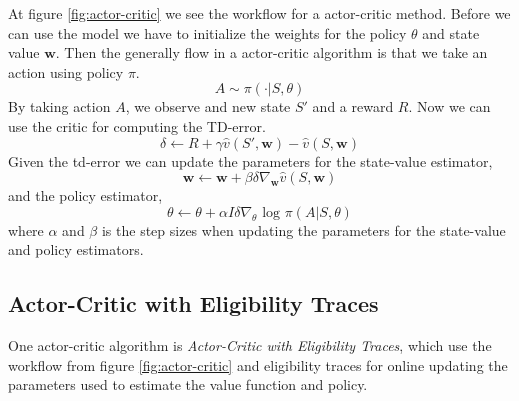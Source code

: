 \documentclass[11pt]{article}
\begin{document}
At figure \ref{fig:actor-critic} we see the workflow for a actor-critic method. Before we can use the model we have to initialize the weights for the policy $\theta$ and state value $\mathbf{w}$. Then the generally flow in a actor-critic algorithm is that we take an action using policy $\pi$.
\begin{equation}
    A \sim \pi(\cdot | S, \theta)
\end{equation}
By taking action $A$, we observe and new state $S'$ and a reward $R$. Now we can use the critic for computing the TD-error.
\begin{equation}
    \delta \leftarrow R + \gamma \hat{v} (S', \mathbf{w}) - \hat{v}(S, \mathbf{w})
\end{equation}
Given the td-error we can update the parameters for the  state-value estimator,
\begin{equation}
    \mathbf{w} \leftarrow \mathbf{w} + \beta \delta \nabla_{\mathbf{w}} \hat{v}(S, \mathbf{w})
\end{equation}
and the policy estimator,
\begin{equation}
    \theta \leftarrow \theta + \alpha I \delta \nabla_{\theta} \text{ log } \pi(A | S, \theta)
\end{equation}
where $\alpha$ and $\beta$ is the step sizes when updating the parameters for the state-value and policy estimators.


\subsection{Actor-Critic with Eligibility Traces}

One actor-critic algorithm is \textit{Actor-Critic with Eligibility Traces}, which use the workflow from figure \ref{fig:actor-critic} and eligibility traces for online updating the parameters used to estimate the value function and policy.
\end{document}
